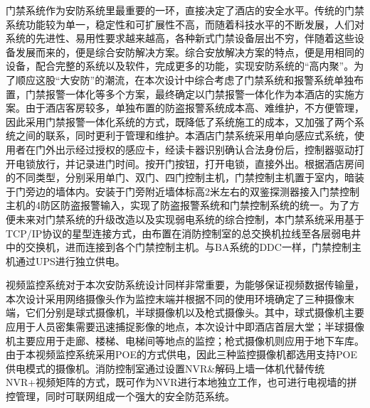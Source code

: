 \documentclass{gdutart}
\begin{document}
    门禁系统作为安防系统里最重要的一环，直接决定了酒店的安全水平。传统的门禁系统功能较为单一，稳定性和可扩展性不高，而随着科技水平的不断发展，人们对系统的先进性、易用性要求越来越高，各种新式门禁设备层出不穷，伴随着这些设备发展而来的，便是综合安防解决方案。综合安放解决方案的特点，便是用相同的设备，配合完整的系统以及软件，完成更多的功能，实现安防系统的“高内聚”。为了顺应这股“大安防”的潮流，在本次设计中综合考虑了门禁系统和报警系统单独布置，门禁报警一体化等多个方案，最终确定以门禁报警一体化作为本酒店的实施方案。由于酒店客房较多，单独布置的防盗报警系统成本高、难维护，不方便管理，因此采用门禁报警一体化系统的方式，既降低了系统施工的成本，又加强了两个系统之间的联系，同时更利于管理和维护。本酒店门禁系统采用单向感应式系统，使用者在门外出示经过授权的感应卡，经读卡器识别确认合法身份后，控制器驱动打开电锁放行，并记录进门时间。按开门按钮，打开电锁，直接外出。根据酒店房间的不同类型，分别采用单门、双门、四门控制主机，门禁控制主机置于室内，暗装于门旁边的墙体内。安装于门旁附近墙体标高2米左右的双鉴探测器接入门禁控制主机的4防区防盗报警输入，实现了防盗报警系统和门禁控制系统的统一。为了方便未来对门禁系统的升级改造以及实现弱电系统的综合控制，本门禁系统采用基于TCP/IP协议的星型连接方式，由布置在消防控制室的总交换机拉线至各层弱电井中的交换机，进而连接到各个门禁控制主机。与BA系统的DDC一样，门禁控制主机通过UPS进行独立供电。

    视频监控系统对于本次安防系统设计同样非常重要，为能够保证视频数据传输量，本次设计采用网络摄像头作为监控末端并根据不同的使用环境确定了三种摄像末端，它们分别是球式摄像机，半球摄像机以及枪式摄像头。其中，球式摄像机主要应用于人员密集需要迅速捕捉影像的地点，本次设计中即酒店首层大堂；半球摄像机主要应用于走廊、楼梯、电梯间等地点的监控；枪式摄像机则应用于地下车库。由于本视频监控系统采用POE的方式供电，因此三种监控摄像机都选用支持POE供电模式的摄像机。消防控制室通过设置NVR\&解码上墙一体机代替传统NVR+视频矩阵的方式，既可作为NVR进行本地独立工作，也可进行电视墙的拼控管理，同时可联网组成一个强大的安全防范系统。
\end{document}

